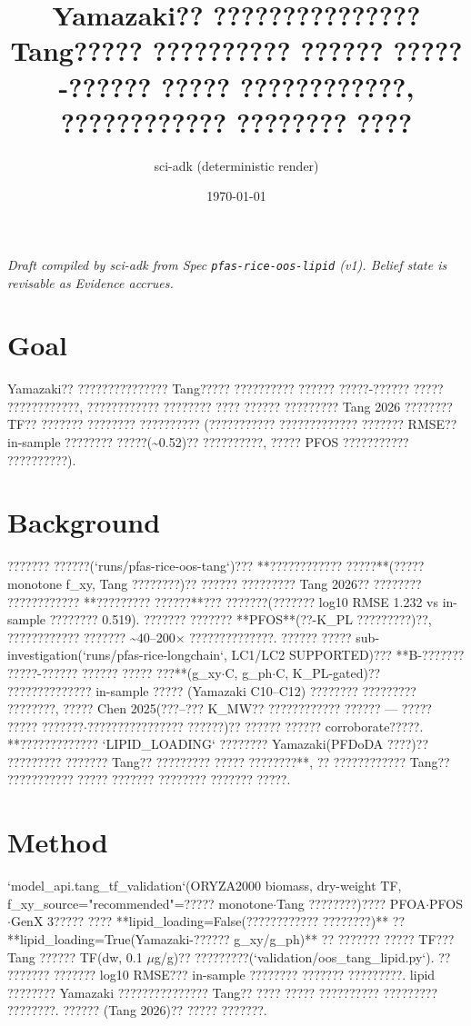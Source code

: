 \documentclass{article}
\title{Yamazaki?? ??????????????? Tang????? ?????????? ?????? ?????-?????? ????? ????????????, ???????????? ???????? ????}
\author{sci-adk (deterministic render)}
\date{\today}
\begin{document}
\maketitle

\noindent\textit{Draft compiled by sci-adk from Spec \texttt{pfas-rice-oos-lipid} (v1). Belief state is revisable as Evidence accrues.}

\section{Goal}
Yamazaki?? ??????????????? Tang????? ?????????? ?????? ?????-?????? ????? ????????????, ???????????? ???????? ????
?????? ????????? Tang 2026 ???????? TF?? ??????? ???????? ?????????? (??????????? ????????????? ??????? RMSE??
in-sample ???????? ?????(\textasciitilde{}0.52)?? ??????????, ????? PFOS ??????????? ??????????).

\section{Background}
??????? ??????(`runs/pfas-rice-oos-tang`)??? **???????????? ?????**(????? monotone f\_xy, Tang ????????)??
?????? ????????? Tang 2026?? ???????? ???????????? **????????? ??????**??? ???????(??????? log10 RMSE 1.232
vs in-sample ???????? 0.519). ??????? ??????? **PFOS**(??-K\_PL ?????????)??, ???????????? ???????
\textasciitilde{}40--200$\times$ ??????????????. ?????? ????? sub-investigation(`runs/pfas-rice-longchain`, LC1/LC2 SUPPORTED)???
**B-??????? ?????-?????? ?????? ????? ???**(g\_xy$\cdot$C, g\_ph$\cdot$C, K\_PL-gated)?? ?????????????? in-sample ?????
(Yamazaki C10--C12) ???????? ????????? ????????, ????? Chen 2025(???--??? K\_MW?? ???????????? ?????? --- ????? ?????
???????$\cdot$???????????????? ??????)?? ?????? ?????? corroborate?????. **????????????? `LIPID\_LOADING` ????????
Yamazaki(PFDoDA ????)?? ????????? ??????? Tang?? ????????? ????? ????????**, ?? ???????????? Tang?? ???????????
????? ??????? ???????? ??????? ?????.

\section{Method}
`model\_api.tang\_tf\_validation`(ORYZA2000 biomass, dry-weight TF, f\_xy\_source="recommended"=?????
monotone$\cdot$Tang ????????)???? PFOA$\cdot$PFOS$\cdot$GenX 3????? ???? **lipid\_loading=False(???????????? ????????)** ??
**lipid\_loading=True(Yamazaki-?????? g\_xy/g\_ph)** ?? ??????? ????? TF??? Tang ?????? TF(dw, 0.1 $\mu$g/g)??
?????????(`validation/oos\_tang\_lipid.py`). ?? ??????? ??????? log10 RMSE??? in-sample ???????? ???????
?????????. lipid ???????? Yamazaki ??????????????? Tang?? ???? ????? ?????????? ????????? ????????. ??????
(Tang 2026)?? ????? ???????.
\end{document}
